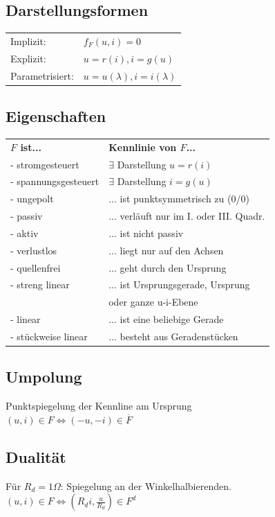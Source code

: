 \documentclass[a4paper,twocolumn,10pt]{article}
\begin{document}
\subsection*{Darstellungsformen}
\begin{tabular}{ll}
Implizit: & $f_F(u,i)=0$\\
Explizit: & $u=r(i), i=g(u)$\\
Parametrisiert: & $u=u(\lambda), i=i(\lambda)$
\end{tabular}

\subsection*{Eigenschaften}
\begin{tabular}{ll}
\textbf{$F$ ist...} & \textbf{Kennlinie von $F$...}\\
- stromgesteuert & $\exists$ Darstellung $u=r(i)$\\
- spannungsgesteuert & $\exists$ Darstellung $i=g(u)$\\
- ungepolt & ... ist punktsymmetrisch zu (0/0)\\
- passiv & ... verläuft nur im I. oder III. Quadr.\\
- aktiv & ... ist nicht passiv\\
- verlustlos & ... liegt nur auf den Achsen\\
- quellenfrei & ... geht durch den Ursprung\\
- streng linear & ... ist Ursprungsgerade, Ursprung\\
 & \;\;\;\;oder ganze u-i-Ebene\\
- linear & ... ist eine beliebige Gerade\\
- stückweise linear & ... besteht aus Geradenstücken
\end{tabular}

\subsection*{Umpolung}
Punktspiegelung der Kennline am Ursprung\\
$(u,i)\in F \Leftrightarrow (-u,-i)\in \overline{F}$

\subsection*{Dualität}
Für $R_d=1 \Omega$: Spiegelung an der Winkelhalbierenden.\\
$(u,i)\in F \Leftrightarrow (R_di,\frac{u}{R_d})\in F^d$
\end{document}
